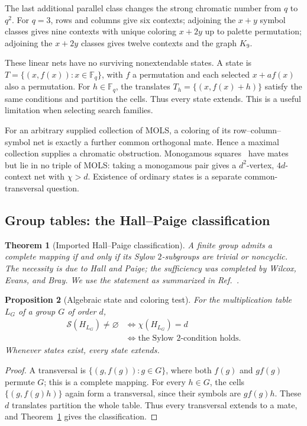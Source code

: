 \documentclass[aps,pra,reprint,superscriptaddress,longbibliography,nofootinbib,floatfix,10pt]{revtex4-2}
\newtheorem{theorem}{Theorem}
\newtheorem{proposition}[theorem]{Proposition}
\theoremstyle{definition}\newtheorem{definition}[theorem]{Definition}
\theoremstyle{remark}\newtheorem{remark}[theorem]{Remark}
\newcommand{\F}{\mathbb F}\newcommand{\Z}{\mathbb Z}\newcommand{\PP}{\mathbb P}
\newcommand{\Sc}{\mathcal S}\newcommand{\Cc}{\mathcal C}
\begin{document}
The last additional parallel class changes the strong chromatic number from $q$ to $q^2$. For $q=3$, rows and columns give six contexts; adjoining the $x+y$ symbol classes gives nine contexts with unique coloring $x+2y$ up to palette permutation; adjoining the $x+2y$ classes gives twelve contexts and the graph $K_9$.

These linear nets have no surviving nonextendable states. A state is $T=\{(x,f(x)):x\in\F_q\}$, with $f$ a permutation and each selected $x+af(x)$ also a permutation. For $h\in\F_q$, the translates $T_h=\{(x,f(x)+h)\}$ satisfy the same conditions and partition the cells. Thus every state extends. This is a useful limitation when selecting search families.

For an arbitrary supplied collection of MOLS, a coloring of its row--column--symbol net is exactly a further common orthogonal mate. Hence a maximal collection supplies a chromatic obstruction. Monogamous squares~\cite{danziger2011monogamous} have mates but lie in no triple of MOLS: taking a monogamous pair gives a $d^2$-vertex, $4d$-context net with $\chi>d$. Existence of ordinary states is a separate common-transversal question.

\subsection{Group tables: the Hall--Paige classification}\label{sec:hall-paige}

\begin{theorem}[Imported Hall--Paige classification]\label{thm:hall-paige}
A finite group admits a complete mapping if and only if its Sylow $2$-subgroups are trivial or noncyclic. The necessity is due to Hall and Paige; the sufficiency was completed by Wilcox, Evans, and Bray. We use the statement as summarized in Ref.~\cite[Theorems 1--2]{evans2012strong}.
\end{theorem}

\begin{proposition}[Algebraic state and coloring test]\label{prop:group-test}
For the multiplication table $L_G$ of a group $G$ of order $d$,
\begin{equation}\label{eq:group-classification}
\begin{aligned}
\Sc(H_{L_G})\ne\varnothing
&\iff\chi(H_{L_G})=d\\
&\iff\text{the Sylow $2$-condition holds}.
\end{aligned}
\end{equation}
Whenever states exist, every state extends.
\end{proposition}
\begin{proof}
A transversal is $\{(g,f(g)):g\in G\}$, where both $f(g)$ and $gf(g)$ permute $G$; this is a complete mapping. For every $h\in G$, the cells $\{(g,f(g)h)\}$ again form a transversal, since their symbols are $gf(g)h$. These $d$ translates partition the whole table. Thus every transversal extends to a mate, and Theorem~\ref{thm:hall-paige} gives the classification.
\end{proof}
\end{document}

